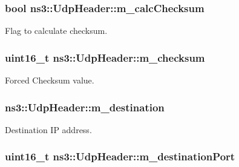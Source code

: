 \subsubsection[{\texorpdfstring{m\+\_\+calc\+Checksum}{m_calcChecksum}}]{\setlength{\rightskip}{0pt plus 5cm}bool ns3\+::\+Udp\+Header\+::m\+\_\+calc\+Checksum\hspace{0.3cm}{\ttfamily [private]}}\hypertarget{classns3_1_1UdpHeader_ab183811507f758b062c57e6a67cb1e29}{}\label{classns3_1_1UdpHeader_ab183811507f758b062c57e6a67cb1e29}


Flag to calculate checksum. 

\subsubsection[{\texorpdfstring{m\+\_\+checksum}{m_checksum}}]{\setlength{\rightskip}{0pt plus 5cm}uint16\+\_\+t ns3\+::\+Udp\+Header\+::m\+\_\+checksum\hspace{0.3cm}{\ttfamily [private]}}\hypertarget{classns3_1_1UdpHeader_ad498526e1d270564d0a439bff1cc4877}{}\label{classns3_1_1UdpHeader_ad498526e1d270564d0a439bff1cc4877}


Forced Checksum value. 

\subsubsection[{\texorpdfstring{m\+\_\+destination}{m_destination}}]{ ns3\+::\+Udp\+Header\+::m\+\_\+destination\hspace{0.3cm}{\ttfamily [private]}}\hypertarget{classns3_1_1UdpHeader_a262f3acd93ce4d1917917b2c1020e129}{}\label{classns3_1_1UdpHeader_a262f3acd93ce4d1917917b2c1020e129}


Destination IP address. 

\subsubsection[{\texorpdfstring{m\+\_\+destination\+Port}{m_destinationPort}}]{\setlength{\rightskip}{0pt plus 5cm}uint16\+\_\+t ns3\+::\+Udp\+Header\+::m\+\_\+destination\+Port\hspace{0.3cm}{\ttfamily [private]}}\hypertarget{classns3_1_1UdpHeader_a4c7f437d51670b52805f67116648f792}{}\label{classns3_1_1UdpHeader_a4c7f437d51670b52805f67116648f792}


